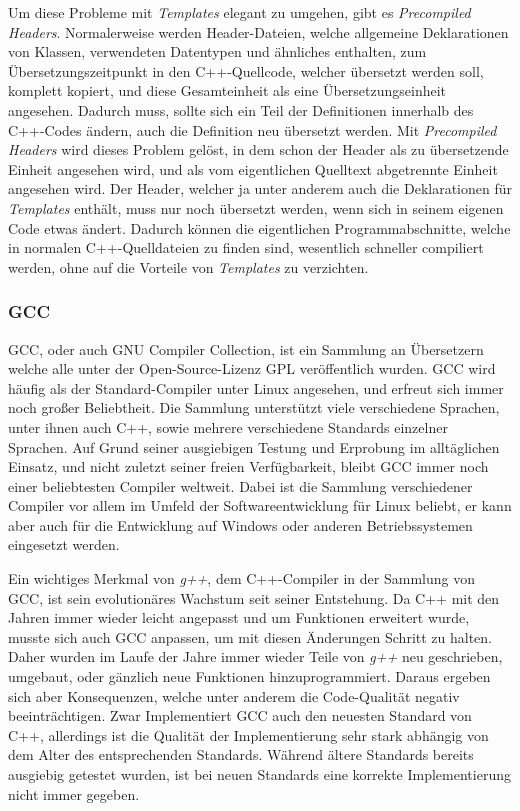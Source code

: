Um diese Probleme mit \textit{Templates} elegant zu umgehen, gibt es \textit{Precompiled Headers}. Normalerweise werden Header-Dateien, welche allgemeine Deklarationen von Klassen, verwendeten Datentypen
und ähnliches enthalten, zum Übersetzungszeitpunkt in den C++-Quellcode, welcher übersetzt werden soll, komplett kopiert, und diese Gesamteinheit als eine Über\-setzungs\-einheit angesehen. Dadurch muss, sollte
sich ein Teil der Definitionen innerhalb des C++-Codes ändern, auch die Definition neu übersetzt werden. Mit \textit{Precompiled Headers} wird dieses Problem gelöst, in dem schon der Header als zu übersetzende
Einheit angesehen wird, und als vom eigentlichen Quelltext abgetrennte Einheit angesehen wird. Der Header, welcher ja unter anderem auch die Deklarationen für \textit{Templates} enthält, muss nur noch
übersetzt werden, wenn sich in seinem eigenen Code etwas ändert. Dadurch können die eigentlichen Programmabschnitte, welche in normalen C++-Quelldateien zu finden sind, wesentlich schneller
compiliert werden, ohne auf die Vorteile von \textit{Templates} zu verzichten.


\subsubsection{GCC}
GCC, oder auch GNU Compiler Collection, ist ein Sammlung an Übersetzern welche alle unter der Open-Source-Lizenz GPL veröffentlich wurden. GCC wird häufig als der Standard-Compiler unter Linux angesehen,
und erfreut sich immer noch großer Beliebtheit. Die Sammlung unterstützt viele verschiedene Sprachen, unter ihnen auch C++, sowie mehrere verschiedene Standards einzelner Sprachen. Auf Grund seiner
ausgiebigen Testung und Erprobung im alltäglichen Einsatz, und nicht zuletzt seiner freien Verfügbarkeit, bleibt GCC immer noch einer beliebtesten Compiler weltweit. Dabei ist die Sammlung verschiedener
Compiler vor allem im Umfeld der Softwareentwicklung für Linux beliebt, er kann aber auch für die Entwicklung auf Windows oder anderen Betriebssystemen eingesetzt werden.

Ein wichtiges Merkmal von \textit{g++}, dem C++-Compiler in der Sammlung von GCC, ist sein evolutionäres Wachstum seit seiner Entstehung. Da C++ mit den Jahren immer wieder leicht angepasst und um Funktionen
erweitert wurde, musste sich auch GCC anpassen, um mit diesen Änderungen Schritt zu halten. Daher wurden im Laufe der Jahre immer wieder Teile von \textit{g++} neu geschrieben, umgebaut, oder gänzlich
neue Funktionen hinzuprogrammiert. Daraus ergeben sich aber Konsequenzen, welche unter anderem die Code-Qualität negativ beeinträchtigen. Zwar Implementiert GCC auch den neuesten Standard von C++, allerdings
ist die Qualität der Implementierung sehr stark abhängig von dem Alter des entsprechenden Standards. Während ältere Standards bereits ausgiebig getestet wurden, ist bei neuen Standards eine korrekte 
Implementierung nicht immer gegeben. 


